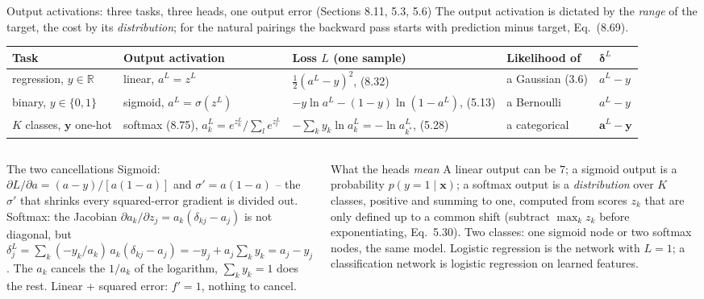 \documentclass[10pt,aspectratio=169]{beamer}
\begin{document}
\begin{frame}{Output activations: three tasks, three heads, one output error (Sections 8.11, 5.3, 5.6)}
\footnotesize
The output activation is dictated by the \emph{range} of the target, the
cost by its \emph{distribution}; for the natural pairings the backward pass
starts with prediction minus target, Eq.~(8.69).
\begin{center}
\scriptsize
\setlength{\tabcolsep}{4pt}
\setlength{\tabcolsep}{3pt}
\begin{tabular}{@{}lllll@{}}
\toprule
Task & Output activation & Loss $L$ (one sample) & Likelihood of & $\bm{\delta}^{L}$\\
\midrule
regression, $y\in\mathbb{R}$ & linear, $a^{L}=z^{L}$ & $\tfrac12(a^{L}-y)^{2}$, (8.32) & a Gaussian (3.6) & $a^{L}-y$\\[2pt]
binary, $y\in\{0,1\}$ & sigmoid, $a^{L}=\sigma(z^{L})$ & $-y\ln a^{L}-(1-y)\ln(1-a^{L})$, (5.13) & a Bernoulli & $a^{L}-y$\\[2pt]
$K$ classes, $\bm{y}$ one-hot & softmax (8.75), $a_k^{L}=e^{z_k^{L}}/\sum_le^{z_l^{L}}$ & $-\sum_ky_k\ln a_k^{L}=-\ln a_{k^{*}}^{L}$, (5.28) & a categorical & $\bm{a}^{L}-\bm{y}$\\
\bottomrule
\end{tabular}
\end{center}
\begin{columns}[T]
\begin{column}{0.5\textwidth}
\begin{block}{The two cancellations}
\scriptsize
Sigmoid: $\partial L/\partial a=(a-y)/[a(1-a)]$ and $\sigma'=a(1-a)$ --
the $\sigma'$ that shrinks every squared-error gradient is divided out.
Softmax: the Jacobian $\partial a_k/\partial z_j=a_k(\delta_{kj}-a_j)$ is not
diagonal, but
$\delta_j^{L}=\sum_k(-y_k/a_k)\,a_k(\delta_{kj}-a_j)=-y_j+a_j\sum_ky_k=a_j-y_j$.
The $a_k$ cancels the $1/a_k$ of the logarithm, $\sum_ky_k=1$ does the rest.
Linear + squared error: $f'=1$, nothing to cancel.
\end{block}
\end{column}
\begin{column}{0.48\textwidth}
\begin{block}{What the heads \emph{mean}}
\scriptsize
A linear output can be $7$; a sigmoid output is a probability
$p(y=1\mid\bm{x})$; a softmax output is a \emph{distribution} over $K$
classes, positive and summing to one, computed from scores $z_k$ that are
only defined up to a common shift (subtract $\max_kz_k$ before
exponentiating, Eq.~5.30).  Two classes: one sigmoid node or two softmax
nodes, the same model.  Logistic regression is the network with $L=1$;
a classification network is logistic regression on learned features.
\end{block}
\end{column}
\end{columns}
\end{frame}
\end{document}
